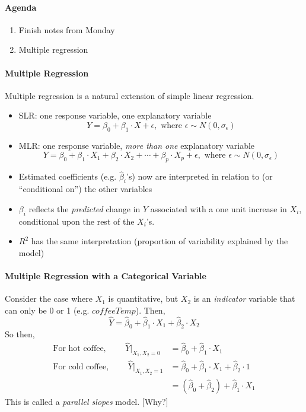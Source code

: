 \documentclass[10pt]{article}\usepackage[]{graphicx}\usepackage[]{color}
\begin{document}

\paragraph{Agenda}
\begin{enumerate}
  \itemsep0em 
  \item Finish notes from Monday
  \item Multiple regression
\end{enumerate}


\paragraph{Multiple Regression}

Multiple regression is a natural extension of simple linear regression.
\begin{itemize}
  \itemsep0in
  \item SLR: one response variable, one explanatory variable
  $$
    Y = \beta_0 + \beta_1 \cdot X + \epsilon, \text{ where } \epsilon \sim N(0, \sigma_\epsilon)
  $$
  \item MLR: one response variable, \emph{more than one} explanatory variable
  $$
    Y = \beta_0 + \beta_1 \cdot X_1 + \beta_2 \cdot X_2 + \cdots + \beta_p \cdot X_p + \epsilon, \text{ where } \epsilon \sim N(0, \sigma_\epsilon)
  $$
  \item Estimated coefficients (e.g. $\hat{\beta}_i$'s) now are interpreted in relation to (or ``conditional on'') the other variables
  \item $\beta_i$ reflects the \emph{predicted} change in $Y$ associated with a one unit increase in $X_i$, conditional upon the rest of the $X_i$'s.
  \item $R^2$ has the same interpretation (proportion of variability explained by the model)
\end{itemize}


\paragraph{Multiple Regression with a Categorical Variable}

Consider the case where $X_1$ is quantitative, but $X_2$ is an \emph{indicator} variable that can only be 0 or 1 (e.g. $coffeeTemp$). Then,
$$
  \hat{Y} = \hat{\beta}_0 + \hat{\beta}_1 \cdot X_1 + \hat{\beta}_2 \cdot X_2
$$
So then,
  \begin{align*}
    \text{For hot coffee, } \qquad \hat{Y} |_{ X_1, X_2 = 0} &= \hat{\beta}_0 + \hat{\beta}_1 \cdot X_1 \\
    \text{For cold coffee, } \qquad \hat{Y} |_{ X_1, X_2 = 1} &= \hat{\beta}_0 + \hat{\beta}_1 \cdot X_1 + \hat{\beta}_2 \cdot 1 \\
      &= \left( \hat{\beta}_0 + \hat{\beta}_2 \right) + \hat{\beta}_1 \cdot X_1
  \end{align*}
This is called a \emph{parallel slopes} model. [Why?]
\end{document}
